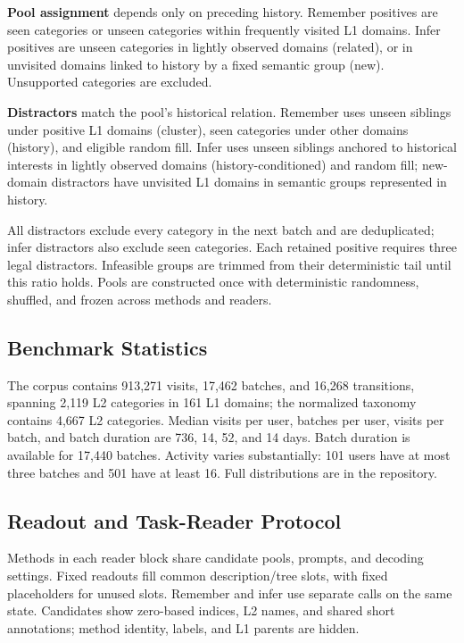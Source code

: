 \documentclass[sigconf,nonacm,balance=false]{acmart}
\begin{document}
\textbf{Pool assignment} depends only on preceding history. Remember positives are seen categories or unseen categories within frequently visited L1 domains. Infer positives are unseen categories in lightly observed domains (related), or in unvisited domains linked to history by a fixed semantic group (new). Unsupported categories are excluded.

\textbf{Distractors} match the pool's historical relation. Remember uses unseen siblings under positive L1 domains (cluster), seen categories under other domains (history), and eligible random fill. Infer uses unseen siblings anchored to historical interests in lightly observed domains (history-conditioned) and random fill; new-domain distractors have unvisited L1 domains in semantic groups represented in history.

All distractors exclude every category in the next batch and are deduplicated; infer distractors also exclude seen categories. Each retained positive requires three legal distractors. Infeasible groups are trimmed from their deterministic tail until this ratio holds. Pools are constructed once with deterministic randomness, shuffled, and frozen across methods and readers.

\subsection{Benchmark Statistics}
\label{app:bench-stats}
The corpus contains 913{,}271 visits, 17{,}462 batches, and 16{,}268 transitions, spanning 2{,}119 L2 categories in 161 L1 domains; the normalized taxonomy contains 4{,}667 L2 categories. Median visits per user, batches per user, visits per batch, and batch duration are 736, 14, 52, and 14 days. Batch duration is available for 17{,}440 batches. Activity varies substantially: 101 users have at most three batches and 501 have at least 16. Full distributions are in the repository.

\subsection{Readout and Task-Reader Protocol}
\label{app:bench-protocol}
Methods in each reader block share candidate pools, prompts, and decoding settings. Fixed readouts fill common description/tree slots, with fixed placeholders for unused slots. Remember and infer use separate calls on the same state. Candidates show zero-based indices, L2 names, and shared short annotations; method identity, labels, and L1 parents are hidden.
\end{document}
